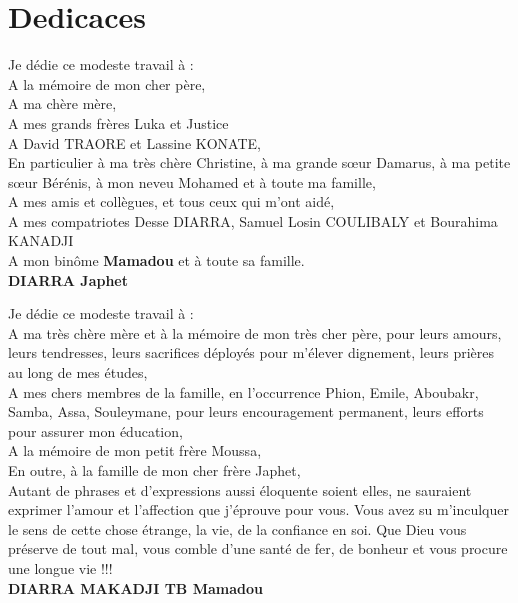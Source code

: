 \chapter*{Dedicaces}
Je dédie ce modeste travail à :\\
\hspace{8cm} A la mémoire de mon cher père,\\
\hspace{8cm}A ma chère mère,\\
\hspace{8cm}A mes grands frères Luka et Justice\\
\hspace{9cm}A David TRAORE et Lassine KONATE,\\
\hspace{8cm}En particulier à ma très chère Christine, à ma grande sœur Damarus, à ma petite sœur Bérénis, à mon neveu Mohamed et à toute ma famille,\\
\hspace{7cm}A mes amis et collègues, et tous ceux qui m’ont aidé,\\
\hspace{7cm}A mes compatriotes Desse DIARRA, Samuel Losin COULIBALY et Bourahima KANADJI\\
      A mon binôme \textbf{Mamadou} et à toute sa famille.\\
		
	\textbf{DIARRA Japhet}\vspace{1cm}

Je dédie ce modeste travail à :\\
\hspace{8cm}A ma très chère mère et à la mémoire de mon très cher père, pour leurs amours, leurs tendresses, leurs sacrifices déployés pour m’élever dignement, leurs prières au long de mes études,\\
\hspace{8cm}A mes chers membres de la famille, en l'occurrence Phion, Emile, Aboubakr, Samba, Assa, Souleymane, pour leurs encouragement permanent, leurs efforts pour assurer mon éducation,\\
\hspace{8cm}A la mémoire de mon petit frère Moussa,\\
\hspace{8cm}En outre, à la famille de mon cher frère Japhet,\\
\hspace{8cm}Autant de phrases et d’expressions aussi éloquente soient elles, ne sauraient exprimer l’amour et l’affection que j’éprouve pour vous. Vous avez su m’inculquer le sens de cette chose étrange, la vie, de la confiance en soi. Que Dieu vous préserve de tout mal, vous comble d'une santé de fer, de bonheur et vous procure une longue vie !!!\\
		
	\textbf{DIARRA MAKADJI TB Mamadou}
